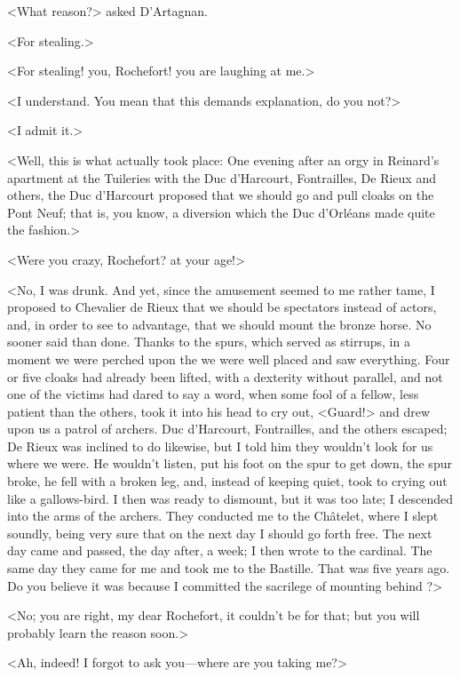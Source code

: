 <What reason?> asked D'Artagnan.

<For stealing.>

<For stealing! you, Rochefort! you are laughing at me.>

<I understand. You mean that this demands explanation, do you not?>

<I admit it.>

<Well, this is what actually took place: One evening after an orgy in Reinard's apartment at the Tuileries with the Duc d'Harcourt, Fontrailles, De Rieux and others, the Duc d'Harcourt proposed that we should go and pull cloaks on the Pont Neuf; that is, you know, a diversion which the Duc d'Orléans made quite the fashion.>

<Were you crazy, Rochefort? at your age!>

<No, I was drunk. And yet, since the amusement seemed to me rather tame, I proposed to Chevalier de Rieux that we should be spectators instead of actors, and, in order to see to advantage, that we should mount the bronze horse. No sooner said than done. Thanks to the spurs, which served as stirrups, in a moment we were perched upon the  we were well placed and saw everything. Four or five cloaks had already been lifted, with a dexterity without parallel, and not one of the victims had dared to say a word, when some fool of a fellow, less patient than the others, took it into his head to cry out, <Guard!> and drew upon us a patrol of archers. Duc d'Harcourt, Fontrailles, and the others escaped; De Rieux was inclined to do likewise, but I told him they wouldn't look for us where we were. He wouldn't listen, put his foot on the spur to get down, the spur broke, he fell with a broken leg, and, instead of keeping quiet, took to crying out like a gallows-bird. I then was ready to dismount, but it was too late; I descended into the arms of the archers. They conducted me to the Châtelet, where I slept soundly, being very sure that on the next day I should go forth free. The next day came and passed, the day after, a week; I then wrote to the cardinal. The same day they came for me and took me to the Bastille. That was five years ago. Do you believe it was because I committed the sacrilege of mounting  behind ?>

<No; you are right, my dear Rochefort, it couldn't be for that; but you will probably learn the reason soon.>

<Ah, indeed! I forgot to ask you—where are you taking me?>

